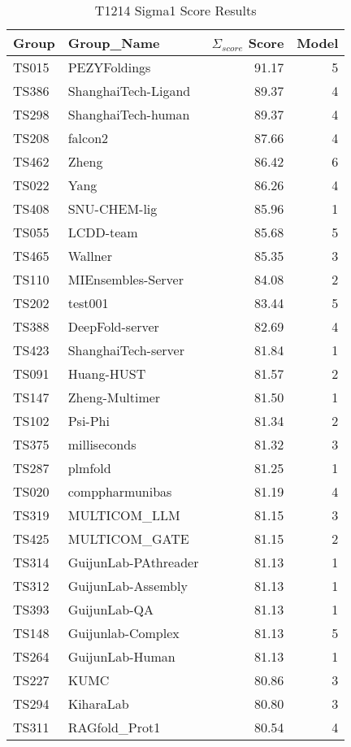 \begin{table*}[ht]
\caption{T1214 Sigma1 Score Results}
\label{tab:T1214_Sigma_score_split}
\scriptsize
\begin{minipage}[t]{0.48\textwidth}
\centering
\begin{tabular}{llrr}
\toprule
Group & Group\_Name & $\Sigma_{score}$ Score & Model \\ 
\midrule
TS015 & PEZYFoldings & 91.17 & 5 \\ 
TS386 & ShanghaiTech-Ligand & 89.37 & 4 \\ 
TS298 & ShanghaiTech-human & 89.37 & 4 \\ 
TS208 & falcon2 & 87.66 & 4 \\ 
TS462 & Zheng & 86.42 & 6 \\ 
TS022 & Yang & 86.26 & 4 \\ 
TS408 & SNU-CHEM-lig & 85.96 & 1 \\ 
TS055 & LCDD-team & 85.68 & 5 \\ 
TS465 & Wallner & 85.35 & 3 \\ 
TS110 & MIEnsembles-Server & 84.08 & 2 \\ 
TS202 & test001 & 83.44 & 5 \\ 
TS388 & DeepFold-server & 82.69 & 4 \\ 
TS423 & ShanghaiTech-server & 81.84 & 1 \\ 
TS091 & Huang-HUST & 81.57 & 2 \\ 
TS147 & Zheng-Multimer & 81.50 & 1 \\ 
TS102 & Psi-Phi & 81.34 & 2 \\ 
TS375 & milliseconds & 81.32 & 3 \\ 
TS287 & plmfold & 81.25 & 1 \\ 
TS020 & comppharmunibas & 81.19 & 4 \\ 
TS319 & MULTICOM\_LLM & 81.15 & 3 \\ 
TS425 & MULTICOM\_GATE & 81.15 & 2 \\ 
TS314 & GuijunLab-PAthreader & 81.13 & 1 \\ 
TS312 & GuijunLab-Assembly & 81.13 & 1 \\ 
TS393 & GuijunLab-QA & 81.13 & 1 \\ 
TS148 & Guijunlab-Complex & 81.13 & 5 \\ 
TS264 & GuijunLab-Human & 81.13 & 1 \\ 
TS227 & KUMC & 80.86 & 3 \\ 
TS294 & KiharaLab & 80.80 & 3 \\ 
TS311 & RAGfold\_Prot1 & 80.54 & 4 \\ 

\end{tabular}
\end{minipage}
\end{table*}
